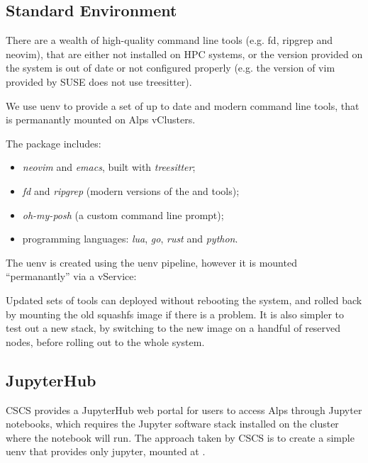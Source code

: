 \subsection{Standard Environment}

There are a wealth of high-quality command line tools (e.g. fd, ripgrep and neovim), that are either not installed on HPC systems, or the version provided on the system is out of date or not configured properly (e.g. the version of vim provided by SUSE does not use treesitter).

We use uenv to provide a set of up to date and modern command line tools, that is permanantly mounted on Alps vClusters.

The package includes:
\begin{itemize}
    \item \emph{neovim} and \emph{emacs}, built with \emph{treesitter};
    \item \emph{fd} and \emph{ripgrep} (modern versions of the  and  tools);
    \item \emph{oh-my-posh} (a custom command line prompt);
    \item programming languages: \emph{lua}, \emph{go}, \emph{rust} and \emph{python}.
\end{itemize}

The uenv is created using the uenv pipeline, however it is mounted ``permanantly'' via a vService:


Updated sets of tools can deployed without rebooting the system, and rolled back by mounting the old squashfs image if there is a problem.
It is also simpler to test out a new stack, by switching to the new image on a handful of reserved nodes, before rolling out to the whole system.

\subsection{JupyterHub}

CSCS provides a JupyterHub web portal for users to access Alps through Jupyter notebooks, which requires the Jupyter software stack installed on the cluster where the notebook will run.
The approach taken by CSCS is to create a simple  uenv that provides only jupyter, mounted at .

